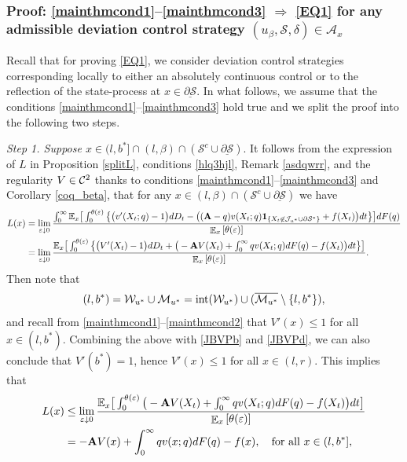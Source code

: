 \documentclass[11pt]{article} %
\DeclareMathOperator{\E}{\mathbb E}
\numberwithin{komcounter}{section}
\renewcommand{\ul}{\underline}
\newcommand{\ol}{\overline}
\renewcommand{\epsilon}{\varepsilon}
\begin{document}
\subsubsection{Proof: \eqref{mainthmcond1}--\eqref{mainthmcond3} $\Rightarrow$ \eqref{EQ1} for any admissible deviation control strategy $(u_\beta, \mathcal{S}, \delta)\in \mathcal{A}_{x}$}
\label{lemma_mixingregion}

Recall that for proving \eqref{EQ1}, we consider deviation control strategies corresponding locally to either an absolutely continuous control
or to the reflection of the state-process at $x\in\ul{\partial \mathcal{S}}$.
In what follows, we assume that the conditions \eqref{mainthmcond1}--\eqref{mainthmcond3} hold true and we split the proof into the following two steps. 

\vspace{1mm}
{\it Step 1. Suppose $x\in (l,b^*] \cap (l,\beta) \cap (\mathcal{S}^c \cup  \ul{\partial \mathcal{S}})$}.
It follows from the expression of $L$ in Proposition \ref{splitL}, conditions \eqref{hlq3hjl}, Remark \ref{asdqwrr}, and the regularity $V \in {\cal C}^2$ thanks to conditions \eqref{mainthmcond1}--\eqref{mainthmcond3} and Corollary \ref{coq_beta}, that for any $x\in (l,\beta) \cap (\mathcal{S}^c \cup \ul{\partial \mathcal{S}})$ we have 
\begin{align*}
L(x) 
&= \lim_{\epsilon \downarrow 0} \frac{\int_0^\infty \mathbb{E}_x\big[ \int_0^{\theta(\epsilon)} \big\{ \big(v'(X_{t};q) - 1 \big) dD_t - \big((\textbf{A}-q) v(X_t;q) {\bf 1}_{\{X_t\not\in \mathcal{J}_{u^*} \cup \partial\mathcal{S}^*\}} + f(X_t) \big) dt \big\} \big] dF(q) }{\E_{x}\left[\theta(\epsilon)\right]} \\
&= \lim_{\epsilon \downarrow 0}
\frac{\mathbb{E}_x\big[ 
\int_0^{\theta(\epsilon)} \big\{ \big(V'(X_{t}) - 1 \big) dD_t + \big(-\textbf{A}V(X_t) + \int_0^\infty q v(X_t;q) dF(q) - f(X_t) \big) dt \big\} \big]}{\E_{x}\left[\theta(\epsilon)\right]}.
\end{align*}
Then note that
\begin{equation} \label{lb}
(l,b^*) 
= \mathcal{W}_{u^*} \cup \mathcal{M}_{u^*} 
= {\rm int}({\mathcal{W}}_{u^*}) \cup (\ol{\mathcal{M}_{u^*}} \setminus \{l, b^*\}),
\end{equation}
and recall from \eqref{mainthmcond1}--\eqref{mainthmcond2} that $V'(x)\leq 1$ for all $x\in (l,b^*)$.
Combining the above with \eqref{JBVPb} and \eqref{JBVPd}, we can also conclude that $V'(b^*) = 1$, hence $V'(x)\leq 1$ for all $x\in (l,r)$.
This implies that 
\begin{align} \label{limB}
L(x)
&\leq \lim_{\epsilon\downarrow 0} \frac{\mathbb{E}_x\big[ \int_0^{\theta(\epsilon)} \big(-\textbf{A}V(X_t) + \int_0^\infty q v(X_t;q) dF(q) - f(X_t) \big) dt \big]}{\E_{x}\left[\theta(\epsilon)\right]} \notag\\
&=- \textbf{A}V(x) + \int_0^\infty q v(x;q) dF(q) - f(x), 
\quad \text{for all } x\in (l,b^*],
\end{align} 
\end{document}
